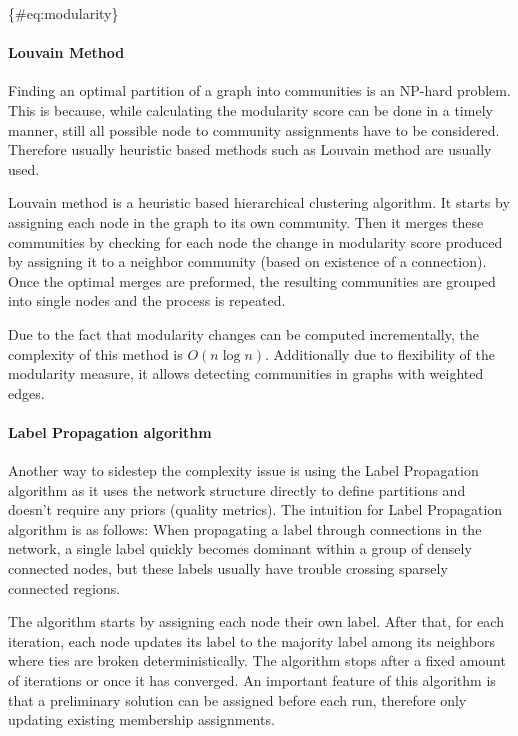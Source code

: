 \documentclass[
acmsmall,
nonacm,
screen,
acmthm]{../../scripts/pandoc/templates/acmart}
\begin{document}
\{\#eq:modularity\}

\hypertarget{louvain-method}{%
\paragraph{Louvain Method}\label{louvain-method}}

Finding an optimal partition of a graph into communities is an NP-hard
problem. This is because, while calculating the modularity score can be
done in a timely manner, still all possible node to community
assignments have to be considered. Therefore usually heuristic based
methods such as Louvain method are usually used.

Louvain method \citep{blondelFastUnfoldingCommunities2008} is a
heuristic based hierarchical clustering algorithm. It starts by
assigning each node in the graph to its own community. Then it merges
these communities by checking for each node the change in modularity
score produced by assigning it to a neighbor community (based on
existence of a connection). Once the optimal merges are preformed, the
resulting communities are grouped into single nodes and the process is
repeated.

Due to the fact that modularity changes can be computed incrementally,
the complexity of this method is \(O(n \log n)\). Additionally due to
flexibility of the modularity measure, it allows detecting communities
in graphs with weighted edges.

\hypertarget{label-propagation-algorithm}{%
\paragraph{Label Propagation
algorithm}\label{label-propagation-algorithm}}

Another way to sidestep the complexity issue is using the Label
Propagation algorithm as it uses the network structure directly to
define partitions and doesn't require any priors (quality metrics). The
intuition for Label Propagation algorithm is as follows: When
propagating a label through connections in the network, a single label
quickly becomes dominant within a group of densely connected nodes, but
these labels usually have trouble crossing sparsely connected regions.

The algorithm starts by assigning each node their own label. After that,
for each iteration, each node updates its label to the majority label
among its neighbors where ties are broken deterministically. The
algorithm stops after a fixed amount of iterations or once it has
converged. An important feature of this algorithm is that a preliminary
solution can be assigned before each run, therefore only updating
existing membership assignments.
\end{document}
